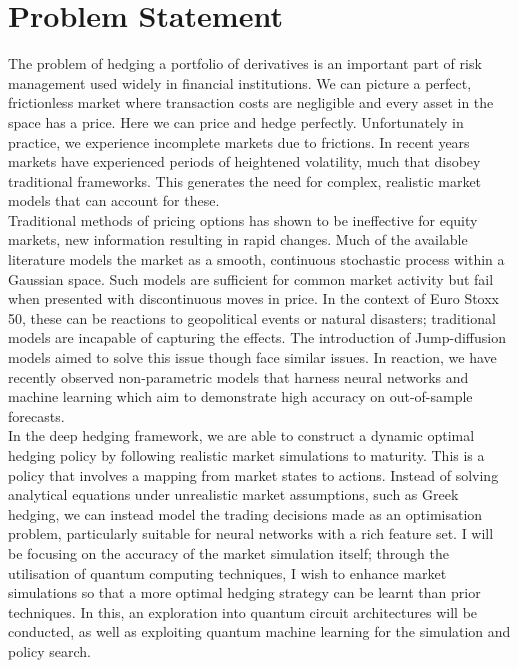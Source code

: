 \documentclass[12pt]{article}
\numberwithin{equation}{section}
\begin{document}
\section{Problem Statement}
The problem of hedging a portfolio of derivatives is an important part of 
risk management used widely in financial institutions. We can picture a perfect, 
frictionless market where transaction costs are negligible and every asset in 
the space has a price. Here we can price and hedge perfectly. Unfortunately in 
practice, we experience incomplete markets due to frictions. In recent years 
markets have experienced periods of heightened volatility, much that disobey 
traditional frameworks. This generates the need for complex, realistic market 
models that can account for these.\\ 
Traditional methods of pricing options has shown to be ineffective for equity 
markets, new information resulting in rapid changes. Much of the available 
literature models the market as a smooth, continuous stochastic process within 
a Gaussian space. Such models are sufficient for common market activity but fail 
when presented with discontinuous moves in price. In the context of Euro Stoxx 50, 
these can be reactions to geopolitical events or natural disasters; traditional
models are incapable of capturing the effects. The introduction of Jump-diffusion 
models aimed to solve this issue though face similar issues. In reaction, we have 
recently observed non-parametric models that harness neural networks and machine 
learning which aim to demonstrate high accuracy on out-of-sample forecasts.
\\
In the deep hedging framework, we are able to construct a dynamic optimal hedging 
policy by following realistic market simulations to maturity. This is a policy 
that involves 
a mapping from market states to actions. Instead of solving analytical equations 
under unrealistic market assumptions, such as Greek hedging, we can instead model
the trading decisions made as an optimisation problem, particularly suitable for 
neural networks with a rich feature set. I will be focusing on the 
accuracy of the market simulation itself; through the utilisation of quantum computing 
techniques, I wish to enhance market simulations so that a more optimal hedging strategy 
can be learnt than prior techniques. In this, an exploration into quantum circuit 
architectures will be conducted, as well as exploiting quantum machine learning 
for the simulation and policy search.

\clearpage
\end{document}
